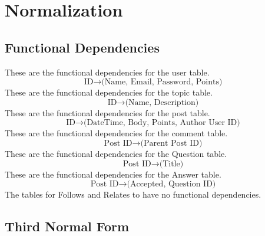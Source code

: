 \section{Normalization}
\subsection{Functional Dependencies}
These are the functional dependencies for the user table.
\[\text{ID} \to \text{(Name, Email, Password, Points)}\]
These are the functional dependencies for the topic table.
\[\text{ID} \to \text{(Name, Description)}\]
These are the functional dependencies for the post table.
\[\text{ID} \to \text{(DateTime, Body, Points, Author User ID)}\]
These are the functional dependencies for the comment table.
\[\text{Post ID} \to \text{(Parent Post ID)}\]
These are the functional dependencies for the Question table.
\[\text{Post ID} \to \text{(Title)}\]
These are the functional dependencies for the Answer table.
\[\text{Post ID} \to \text{(Accepted, Question ID)}\]
The tables for Follows and Relates to have no functional dependencies.



\subsection{Third Normal Form}